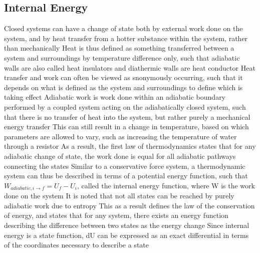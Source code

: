 \documentclass[11 pt, twoside]{article}
\newenvironment{outline*}
{
	\begin{outline}[enumerate]
	}
	{\end{outline}
}
\begin{document}
\subsection{Internal Energy}
\begin{outline*}
\1 Closed systems can have a change of state both by external work done on the system, and by heat transfer from a hotter substance within the system, rather than mechanically
\2 Heat is thus defined as something transferred between a system and surroundings by temperature difference only, such that adiabatic walls are also called heat insulators and diathermic walls are heat conductor
\2 Heat transfer and work can often be viewed as snonymously occurring, such that it depends on what is defined as the system and surroundings to define which is taking effect
\1 Adiabatic work is work done within an adiabatic boundary performed by a coupled system acting on the adiabatically closed system, such that there is no transfer of heat into the system, but rather purely a mechanical energy transfer
\2 This can still result in a change in temperature, based on which parameters are allowed to vary, such as increasing the temperature of water through a resistor
\2 As a result, the first law of thermodynamics states that for any adiabatic change of state, the work done is equal for all adiabatic pathways connecting the states
\3 Similar to a conservative force system, a thermodynamic system can thus be described in terms of a potential energy function, such that $W_{adiabatic, i \to f} = U_f - U_i$, called the internal energy function, where W is the work done on the system
\3 It is noted that not all states can be reached by purely adiabatic work due to entropy
\3 This as a result defines the law of the conservation of energy, and states that for any system, there exists an energy function describing the difference between two states as the energy change
\2 Since internal energy is a state function, dU can be expressed as an exact differential in terms of the coordinates necessary to describe a state
\end{outline*}
\end{document}
